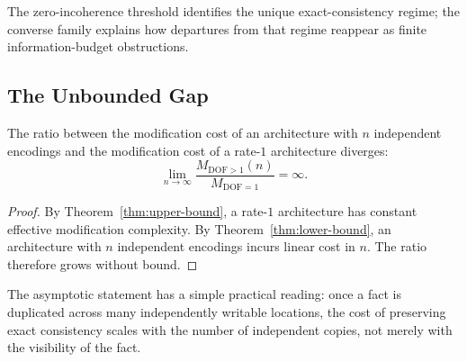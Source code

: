The zero-incoherence threshold identifies the unique exact-consistency regime; the converse family explains how departures from that regime reappear as finite information-budget obstructions.

\subsection{The Unbounded Gap}\label{sec:gap}

\begin{theorem}\label{thm:unbounded-gap}
The ratio between the modification cost of an architecture with $n$ independent encodings and the modification cost of a rate-$1$ architecture diverges:
\[
\lim_{n\to\infty}\frac{M_{\mathrm{DOF}>1}(n)}{M_{\mathrm{DOF}=1}}=\infty.
\]
\end{theorem}

\begin{proof}
By Theorem~\ref{thm:upper-bound}, a rate-$1$ architecture has constant effective modification complexity. By Theorem~\ref{thm:lower-bound}, an architecture with $n$ independent encodings incurs linear cost in $n$. The ratio therefore grows without bound.
\end{proof}

The asymptotic statement has a simple practical reading: once a fact is duplicated across many independently writable locations, the cost of preserving exact consistency scales with the number of independent copies, not merely with the visibility of the fact.

